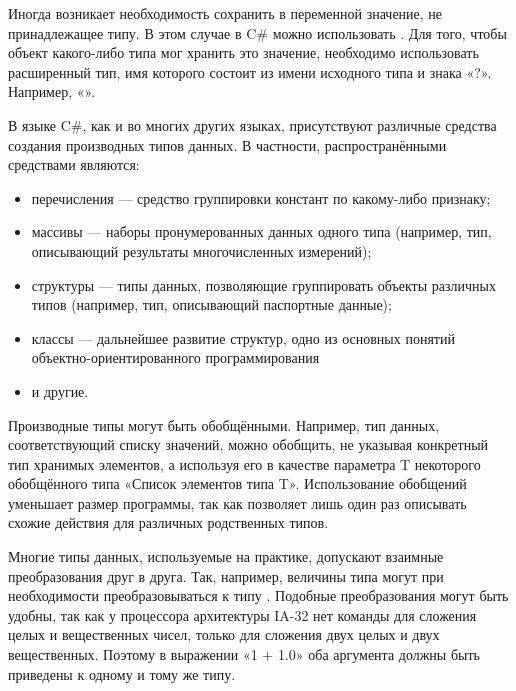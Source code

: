 
Иногда возникает необходимость сохранить в переменной значение, не
принадлежащее типу. В этом случае в C\# можно использовать
. %
Для того, чтобы объект какого-либо типа
мог хранить это значение, необходимо использовать расширенный тип, имя
которого состоит из имени исходного типа и знака «?». Например,
«».


В языке C\#, как и во многих других языках, присутствуют различные
средства создания производных типов данных. В частности, распространёнными
средствами являются:
\begin{itemize}
\item перечисления — средство группировки констант по какому-либо
  признаку;
\item массивы — наборы пронумерованных данных одного типа (например,
  тип, описывающий результаты многочисленных измерений);
\item структуры — типы данных, позволяющие группировать объекты
  различных типов (например, тип, описывающий паспортные данные);
\item классы — дальнейшее развитие структур, одно из основных понятий
  объектно-ориентированного программирования
\item и другие.
\end{itemize}


Производные типы могут быть обобщёнными. Например, тип данных,
соответствующий списку значений, можно обобщить, не указывая конкретный
тип хранимых элементов, а используя его в качестве параметра T
некоторого обобщённого типа «Список элементов типа T». Использование
обобщений уменьшает размер программы, так как позволяет лишь один раз
описывать схожие действия для различных родственных типов.


Многие типы данных, используемые на практике, допускают взаимные
преобразования друг в друга. Так, например, величины типа 
могут при необходимости преобразовываться к типу
. Подобные преобразования могут быть удобны, так как у
процессора архитектуры IA-32 нет команды для сложения целых и
вещественных чисел, только для сложения двух целых и двух
вещественных. Поэтому в выражении «1 + 1.0» оба аргумента должны быть
приведены к одному и тому же типу.

